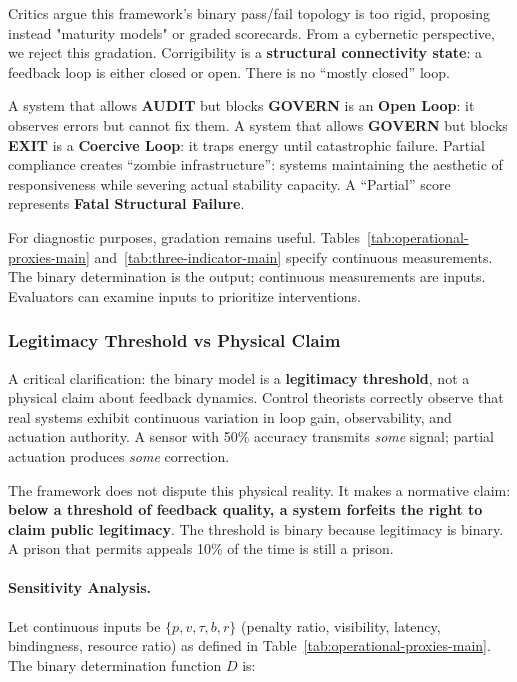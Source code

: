 \documentclass{article}
\begin{document}
Critics argue this framework's binary pass/fail topology is too rigid, proposing instead "maturity models" or graded scorecards. From a cybernetic perspective, we reject this gradation. Corrigibility is a \textbf{structural connectivity state}: a feedback loop is either closed or open. There is no ``mostly closed'' loop.

A system that allows \textbf{AUDIT} but blocks \textbf{GOVERN} is an \textbf{Open Loop}: it observes errors but cannot fix them. A system that allows \textbf{GOVERN} but blocks \textbf{EXIT} is a \textbf{Coercive Loop}: it traps energy until catastrophic failure. Partial compliance creates ``zombie infrastructure'': systems maintaining the aesthetic of responsiveness while severing actual stability capacity. A ``Partial'' score represents \textbf{Fatal Structural Failure}.

For diagnostic purposes, gradation remains useful. Tables~\ref{tab:operational-proxies-main} and~\ref{tab:three-indicator-main} specify continuous measurements. The binary determination is the output; continuous measurements are inputs. Evaluators can examine inputs to prioritize interventions.

\subsubsection{Legitimacy Threshold vs Physical Claim}

A critical clarification: the binary model is a \textbf{legitimacy threshold}, not a physical claim about feedback dynamics. Control theorists correctly observe that real systems exhibit continuous variation in loop gain, observability, and actuation authority. A sensor with 50\% accuracy transmits \textit{some} signal; partial actuation produces \textit{some} correction.

The framework does not dispute this physical reality. It makes a normative claim: \textbf{below a threshold of feedback quality, a system forfeits the right to claim public legitimacy}. The threshold is binary because legitimacy is binary. A prison that permits appeals 10\% of the time is still a prison.

\paragraph{Sensitivity Analysis.} Let continuous inputs be $\{p, v, \tau, b, r\}$ (penalty ratio, visibility, latency, bindingness, resource ratio) as defined in Table~\ref{tab:operational-proxies-main}. The binary determination function $D$ is:
\end{document}
